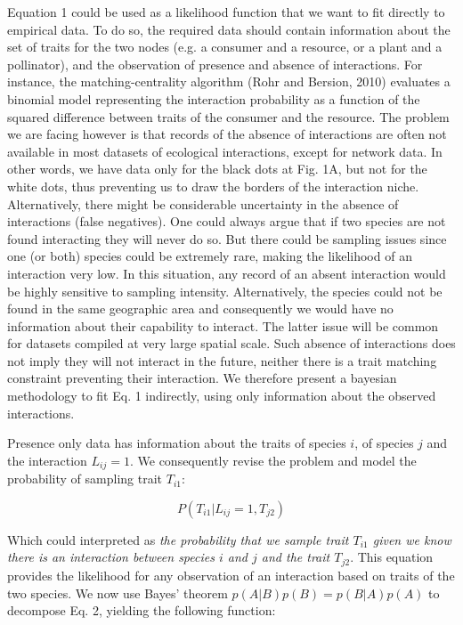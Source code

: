 \documentclass[11pt]{article}
\begin{document}
Equation 1 could be used as a likelihood function that we want to fit directly to empirical data. To do so, the required data should contain information about the set of traits for the two nodes (e.g. a consumer and a resource, or a plant and a pollinator), and the observation of presence and absence of interactions. For instance, the matching-centrality algorithm (Rohr and Bersion, 2010) evaluates a binomial model representing the interaction probability as a function of the squared difference between traits of the consumer and the resource. The problem we are facing however is that records of the absence of interactions are often not available in most datasets of ecological interactions, except for network data. In other words, we have data only for the black dots at Fig. 1A, but not for the white dots, thus preventing us to draw the borders of the interaction niche. Alternatively, there might be considerable uncertainty in the absence of interactions (false negatives). One could always argue that if two species are not found interacting they will never do so. But there could be sampling issues since one (or both) species could be extremely rare, making the likelihood of an interaction very low. In this situation, any record of an absent interaction would be highly sensitive to sampling intensity. Alternatively, the species could not be found in the same geographic area and consequently we would have no information about their capability to interact. The latter issue will be common for datasets compiled at very large spatial scale.  Such absence of interactions does not imply they will not interact in the future, neither there is a trait matching constraint preventing their interaction. We therefore present a bayesian methodology to fit Eq. 1 indirectly, using only information about the observed interactions. 

Presence only data has information about the traits of species $i$, of species $j$ and the interaction $L_{ij} = 1$. We consequently revise the problem and model the probability of sampling trait $T_{i1}$: 

\begin{equation}  
	P(T_{i1}|L_{ij}=1,T_{j2})
\end{equation}

Which could interpreted as \emph{the probability that we sample trait $T_{i1}$ given we know there is an interaction between species $i$ and $j$ and the trait $T_{j2}$}. This equation provides the likelihood for any observation of an interaction based on traits of the two species. We now use Bayes' theorem $p(A|B)p(B) = p(B|A)p(A)$ to decompose Eq. 2, yielding the following function: 
\end{document}
